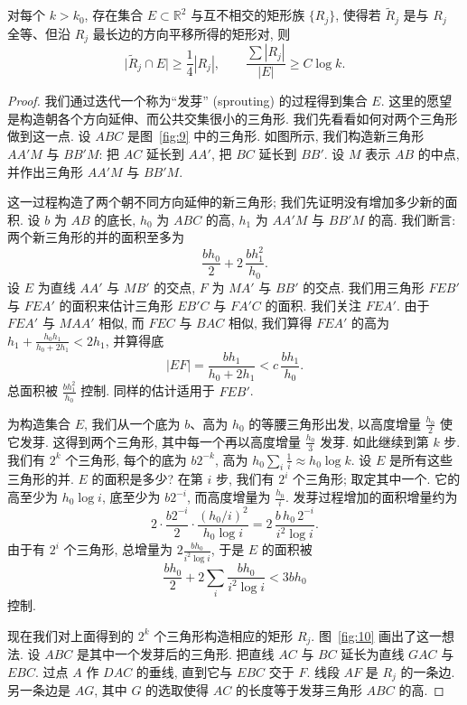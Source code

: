 \begin{theorem}\label{thm:7.4}
对每个 $k>k_0$, 存在集合 $E\subset\mathbb{R}^2$ 与互不相交的矩形族 $\{R_j\}$, 使得若 $\tilde{R}_j$ 是与 $R_j$ 全等、但沿 $R_j$ 最长边的方向平移所得的矩形对, 则
\[
\bigl|\tilde{R}_{j}\cap E\bigr|\geq\frac{1}{4}|R_{j}|,
\qquad
\frac{\sum|R_{j}|}{|E|}\geq C\log k.
\]
\end{theorem}

\begin{proof}
我们通过迭代一个称为``发芽'' (sprouting) 的过程得到集合 $E$. 这里的愿望是构造朝各个方向延伸、而公共交集很小的三角形. 我们先看看如何对两个三角形做到这一点. 设 $ABC$ 是图~\ref{fig:9} 中的三角形. 如图所示, 我们构造新三角形 $AA'M$ 与 $BB'M$: 把 $AC$ 延长到 $AA'$, 把 $BC$ 延长到 $BB'$. 设 $M$ 表示 $AB$ 的中点, 并作出三角形 $AA'M$ 与 $BB'M$.

这一过程构造了两个朝不同方向延伸的新三角形; 我们先证明没有增加多少新的面积. 设 $b$ 为 $AB$ 的底长, $h_{0}$ 为 $ABC$ 的高, $h_{1}$ 为 $AA'M$ 与 $BB'M$ 的高. 我们断言: 两个新三角形的并的面积至多为
\[
\frac{bh_{0}}{2}+2\,\frac{bh_{1}^{2}}{h_{0}}.
\]
设 $E$ 为直线 $AA'$ 与 $MB'$ 的交点, $F$ 为 $MA'$ 与 $BB'$ 的交点. 我们用三角形 $FEB'$ 与 $FEA'$ 的面积来估计三角形 $EB'C$ 与 $FA'C$ 的面积. 我们关注 $FEA'$. 由于 $FEA'$ 与 $MAA'$ 相似, 而 $FEC$ 与 $BAC$ 相似, 我们算得 $FEA'$ 的高为 $h_1+\frac{h_0h_1}{h_0+2h_1}<2h_1$, 并算得底
\[
|EF|=\frac{bh_{1}}{h_{0}+2h_{1}}<c\,\frac{bh_{1}}{h_{0}}.
\]
总面积被 $\frac{bh_{1}^{2}}{h_{0}}$ 控制. 同样的估计适用于 $FEB'$.

为构造集合 $E$, 我们从一个底为 $b$、高为 $h_{0}$ 的等腰三角形出发, 以高度增量 $\frac{h_0}{2}$ 使它发芽. 这得到两个三角形, 其中每一个再以高度增量 $\frac{h_0}{3}$ 发芽. 如此继续到第 $k$ 步. 我们有 $2^k$ 个三角形, 每个的底为 $b2^{-k}$, 高为 $h_0\sum_{i}\frac{1}{i}\approx h_0\log k$. 设 $E$ 是所有这些三角形的并. $E$ 的面积是多少? 在第 $i$ 步, 我们有 $2^i$ 个三角形; 取定其中一个. 它的高至少为 $h_0\log i$, 底至少为 $b2^{-i}$, 而高度增量为 $\frac{h_0}{i}$. 发芽过程增加的面积增量约为
\[
2\cdot\frac{b2^{-i}}{2}\cdot\frac{(h_0/i)^{2}}{h_0\log i}
=2\,\frac{b\,h_{0}\,2^{-i}}{i^{2}\log i}.
\]
由于有 $2^i$ 个三角形, 总增量为 $2\frac{bh_{0}}{i^{2}\log i}$, 于是 $E$ 的面积被
\[
\frac{bh_{0}}{2}+2\sum_{i}\frac{bh_{0}}{i^{2}\log i}<3bh_{0}
\]
控制.

现在我们对上面得到的 $2^k$ 个三角形构造相应的矩形 $R_j$. 图~\ref{fig:10} 画出了这一想法. 设 $ABC$ 是其中一个发芽后的三角形. 把直线 $AC$ 与 $BC$ 延长为直线 $GAC$ 与 $EBC$. 过点 $A$ 作 $DAC$ 的垂线, 直到它与 $EBC$ 交于 $F$. 线段 $AF$ 是 $R_j$ 的一条边. 另一条边是 $AG$, 其中 $G$ 的选取使得 $AC$ 的长度等于发芽三角形 $ABC$ 的高.


\end{proof}

